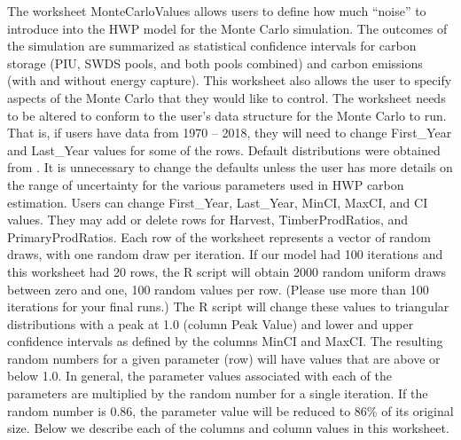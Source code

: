 \documentclass[
  openany]{book}
\begin{document}
The worksheet MonteCarloValues allows users to define how much ``noise'' to introduce into the HWP model for the Monte Carlo simulation. The outcomes of the simulation are summarized as statistical confidence intervals for carbon storage (PIU, SWDS pools, and both pools combined) and carbon emissions (with and without energy capture). This worksheet also allows the user to specify aspects of the Monte Carlo that they would like to control. The worksheet needs to be altered to conform to the user's data structure for the Monte Carlo to run. That is, if users have data from 1970 -- 2018, they will need to change First\_Year and Last\_Year values for some of the rows. Default distributions were obtained from \textcite{stockmann2012}. It is unnecessary to change the defaults unless the user has more details on the range of uncertainty for the various parameters used in HWP carbon estimation. Users can change First\_Year, Last\_Year, MinCI, MaxCI, and CI values. They may add or delete rows for Harvest, TimberProdRatios, and PrimaryProdRatios. Each row of the worksheet represents a vector of random draws, with one random draw per iteration. If our model had 100 iterations and this worksheet had 20 rows, the R script will obtain 2000 random uniform draws between zero and one, 100 random values per row. (Please use more than 100 iterations for your final runs.) The R script will change these values to triangular distributions with a peak at 1.0 (column Peak Value) and lower and upper confidence intervals as defined by the columns MinCI and MaxCI. The resulting random numbers for a given parameter (row) will have values that are above or below 1.0. In general, the parameter values associated with each of the parameters are multiplied by the random number for a single iteration. If the random number is 0.86, the parameter value will be reduced to 86\% of its original size. Below we describe each of the columns and column values in this worksheet.
\end{document}
